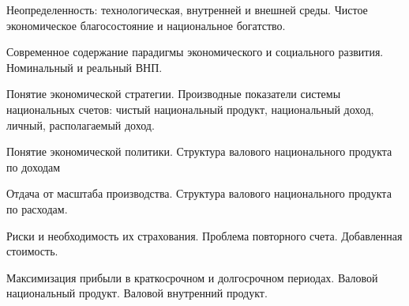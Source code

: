 \z 	Неопределенность: технологическая, внутренней и внешней среды.
 \medskip
\z 	Чистое экономическое благосостояние и национальное богатство.
 \medskip

\newpage


\shapkFull
\setcounter{zad}{0}

\z 	Современное содержание парадигмы экономического и социального развития.
 \medskip
\z 	Номинальный и реальный ВНП.
 \medskip

\newpage


\shapkFull
\setcounter{zad}{0}

\z 	Понятие экономической стратегии.
 \medskip
\z 	Производные показатели системы национальных счетов: чистый национальный продукт, национальный доход, личный, располагаемый доход.
 \medskip

\newpage


\shapkFull
\setcounter{zad}{0}

\z 	Понятие экономической политики.
 \medskip
\z 	Структура валового национального продукта по доходам
 \medskip

\newpage


\shapkFull
\setcounter{zad}{0}

\z 	Отдача от масштаба производства.
 \medskip
\z 	Структура валового национального продукта по расходам.
 \medskip

\newpage


\shapkFull
\setcounter{zad}{0}

\z 	Риски и необходимость их страхования.
 \medskip
\z 	Проблема повторного счета. Добавленная стоимость.
 \medskip

\newpage


\shapkFull
\setcounter{zad}{0}

\z 	Максимизация прибыли в краткосрочном и долгосрочном периодах.
 \medskip
\z 	Валовой национальный продукт.  Валовой внутренний продукт.
 \medskip

\newpage